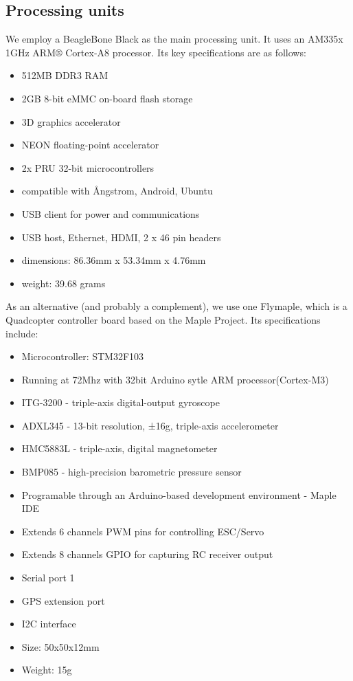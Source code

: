 \documentclass[a4paper, 10pt, twocolumn, titlepage]{article}
\begin{document}
\subsection{Processing units}
We employ a BeagleBone Black as the main processing unit.
It uses an AM335x 1GHz ARM® Cortex-A8 processor.
Its key specifications are as follows:
\begin{itemize}
\itemsep-1mm 
  \item  512MB DDR3 RAM
  \item  2GB 8-bit eMMC on-board flash storage
  \item  3D graphics accelerator
  \item  NEON floating-point accelerator
  \item  2x PRU 32-bit microcontrollers
  \item  compatible with  \AA ngstrom, Android, Ubuntu
  \item  USB client for power and communications
  \item  USB host, Ethernet, HDMI, 2 x 46 pin headers
  \item  dimensions: 86.36mm x 53.34mm x 4.76mm
  \item  weight: 39.68 grams
\end{itemize}

As an alternative (and probably a complement), we use one Flymaple, which is a Quadcopter controller board based on the Maple Project.
Its specifications include:
\begin{itemize}
  \itemsep-1mm
  \item Microcontroller: STM32F103
  \item Running at 72Mhz with 32bit Arduino sytle ARM processor(Cortex-M3)
  \item ITG-3200 - triple-axis digital-output gyroscope
  \item ADXL345 - 13-bit resolution, ±16g, triple-axis accelerometer
  \item HMC5883L - triple-axis, digital magnetometer
  \item BMP085 - high-precision barometric pressure sensor
  \item Programable through an Arduino-based development environment - Maple IDE
  \item Extends 6 channels PWM pins for controlling ESC/Servo
  \item Extends 8 channels GPIO for capturing RC receiver output
  \item Serial port 1
  \item GPS extension port
  \item I2C interface
  \item Size: 50x50x12mm
  \item Weight: 15g
\end{itemize}
\end{document}

